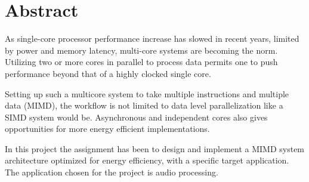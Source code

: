 
\section*{Abstract}

As single-core processor performance increase has slowed in recent years,
limited by power and memory latency, multi-core systems are becoming the norm.
Utilizing two or more cores in parallel to process data permits one to push
performance beyond that of a highly clocked single core.

Setting up such a multicore system to take multiple instructions and multiple
data (MIMD), the workflow is not limited to data level parallelization like a
SIMD system would be. Asynchronous and independent cores also gives
opportunities for more energy efficient implementations.

In this project the assignment has been to design and implement a MIMD system
architecture optimized for energy efficiency, with a specific target
application. The application chosen for the project is audio processing.